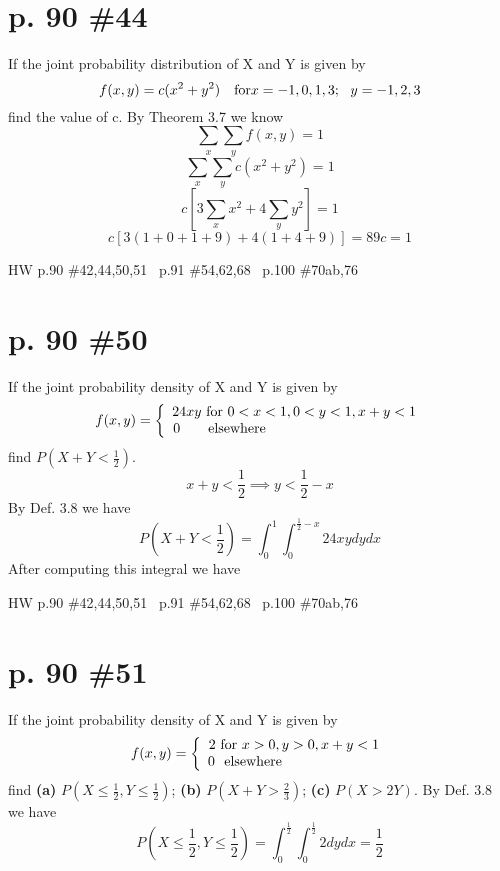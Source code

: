 \documentclass[12pt]{article}
\begin{document}
\section[20pt]{p. 90 \#44}
If the joint probability distribution of X and Y is given by
\[f(x,y)=c(x^2+y^2)\ \ \  \textup{for} x=-1,0,1,3;\ \ y=-1,2,3\]
find the value of c. \newline \newline
By Theorem 3.7 we know
\[\sum_x\sum_yf(x,y)=1 \]
\[\sum_x\sum_yc(x^2+y^2)=1\]
\[c\left[3\sum_xx^2+4\sum_yy^2\right]=1\]
\[c[3(1+0+1+9)+4(1+4+9)]=89c=1\]
\newpage
\maketitle HW p.90 \#42,44,50,51 \ p.91 \#54,62,68 \ p.100 \#70ab,76
\section[20pt]{p. 90 \#50}
If the joint probability density of X and Y is given by
\[f(x,y)=\left\{\begin{array}{ccc}
	24xy \textup{ for }0<x<1,0<y<1,x+y<1\\0 \ \ \ \ \ \textup{ elsewhere\ \ \ \ \ \ \ \ \ \ \ \ \ \ \ \ \ \ \ \ \ \ \ \ \ \ \ \ \ \ \ \ }
	\end{array}\right.\]
find \(P(X+Y<\frac{1}{2})\). \newline \newline
\[x+y<\frac{1}{2}\implies y<\frac{1}{2}-x\]
By Def. 3.8 we have
\[P(X+Y<\frac{1}{2})=\int_0^1\int_{0}^{\frac{1}{2}-x}24xy dy dx\]
After computing this integral we have \newline
{}
\newpage
\maketitle HW p.90 \#42,44,50,51 \ p.91 \#54,62,68 \ p.100 \#70ab,76
\section[20pt]{p. 90 \#51}
If the joint probability density of X and Y is given by
\[f(x,y)=\left\{\begin{array}{ccc}
2 \textup{ for }x>0,y>0,x+y<1\\0 \ \textup{ elsewhere\ \ \ \ \ \ \ \ \ \ \ \ \ \ \ \ \ \ \ \ \ }
\end{array}\right.\]
find \newline
\textbf{(a)} \(P(X\leq\frac{1}{2},Y\leq\frac{1}{2})\); \newline
\textbf{(b)} \(P(X+Y>\frac{2}{3})\); \newline
\textbf{(c)} \(P(X>2Y)\). \newline
\newline
By Def. 3.8 we have
\[P(X\leq\frac{1}{2},Y\leq\frac{1}{2})=\int_0^{\frac{1}{2}}\int_0^{\frac{1}{2}}2dydx=\frac{1}{2}\]
\end{document}
